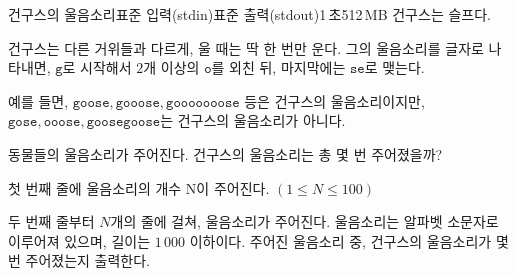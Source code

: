 \begin{problem}{건구스의 울음소리}{표준 입력(stdin)}{표준 출력(stdout)}{1\,초}{512\,MB}
건구스는 슬프다.

건구스는 다른 거위들과 다르게, 울 때는 딱 한 번만 운다. 그의 울음소리를 글자로 나타내면, $\texttt{g}$로 시작해서 $2$개 이상의 $\texttt{o}$를 외친 뒤, 마지막에는 $\texttt{se}$로 맺는다.

예를 들면, $\texttt{goose}, \texttt{gooose}, \texttt{gooooooose}$ 등은 건구스의 울음소리이지만, $\texttt{gose}, \texttt{ooose}, \texttt{goosegoose}$는 건구스의 울음소리가 아니다.

동물들의 울음소리가 주어진다. 건구스의 울음소리는 총 몇 번 주어졌을까?

\InputFile
첫 번째 줄에 울음소리의 개수 N이 주어진다. $(1 \le N \le 100)$

두 번째 줄부터 $N$개의 줄에 걸쳐, 울음소리가 주어진다. 울음소리는 알파벳 소문자로 이루어져 있으며, 길이는 $1\,000$ 이하이다.
\OutputFile
주어진 울음소리 중, 건구스의 울음소리가 몇 번 주어졌는지 출력한다.
\Examples

\begin{example}
%
\end{example}

\end{problem}
